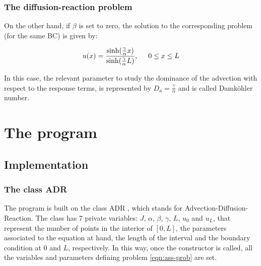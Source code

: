\documentclass[11pt]{article}
\theoremstyle{theorem}
\theoremstyle{definition}
\begin{document}
\subsubsection{The diffusion-reaction problem}
On the other hand, if $\beta$ is set to zero, the solution to the corresponding problem (for the same BC) is given by:

\begin{equation}
	\label{eqn:DR-sol}
	u(x)=\frac{\sinh(\frac{\gamma}{\alpha}x)}{\sinh(\frac{\gamma}{\alpha}L)},\hspace{5mm} 0\le x\le L
\end{equation}

In this case, the relevant parameter to study the dominance of the advection with respect to the response terms, is represented by $D_a=\frac{\gamma}{\alpha}$ and is called Damk\"{o}hler number.\\

\section{The program}
\subsection{Implementation}
\subsubsection{The class ADR}
The program is built on the class ADR , which stands for Advection-Diffusion-Reaction. The class has 7 private variables: $J$, $\alpha$, $\beta$, $\gamma$, $L$, $u_0$ and $u_L$, that represent the number of points in the interior of $[0,L]$, the parameters associated to the equation at hand, the length of the interval and the boundary condition at $0$ and $L$, respectively. In this way, once the constructor is called, all the variables and parameters defining problem \eqref{eqn:ass-prob} are set.\\
\end{document}
